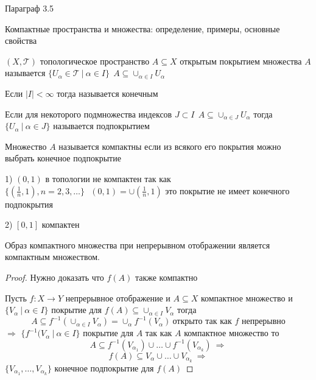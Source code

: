 \begin{title}[\Large]
  Параграф 3.5
\end{title}

\begin{title}[\Large]
  Компактные пространства и множества: определение, примеры, основные свойства
\end{title}

\begin{define}
  $(X, \mathcal{T})$ топологическое пространство $A \subseteq X$ открытым
  покрытием множества $A$ называется $\{ U_{\alpha} \in \mathcal{T} ~ | ~
  \alpha \in I \} ~~ A \subseteq \cup_{\alpha \in I} U_{\alpha}$

  Если $|I| < \infty$ тогда называется конечным

  Если для некоторого подмножества индексов $J \subset I ~~
  A \subseteq \cup_{\alpha \in J} U_{\alpha}$ тогда $\{U_{\alpha} ~ | ~
  \alpha \in J \}$ называется подпокрытием
\end{define}

\begin{define}
  Множество $A$ называется компактны если из всякого его покрытия можно выбрать
  конечное подпокрытие
\end{define}

\begin{block}[Примеры]
  1)  $(0,1)$ в топологии не компактен так как $\{(\frac{1}{n}, 1),
  n = 2,3, \ldots\} ~~~ (0,1) = \cup (\frac{1}{n}, 1)$ это покрытие не имеет
  конечного подпокрытия

  2) $[0,1]$ компактен
\end{block}

\begin{theorem}
  Образ компактного множества при непрерывном отображении является компактным
  множеством.
\end{theorem}

\begin{proof}
  Нужно доказать что $f(A)$ также компактно

  Пусть $f: X \to Y$ непрерывное отображение и $A \subseteq X$ компактное
  множество и $\{ V_{\alpha} ~ | ~ \alpha \in I \}$ покрытие для $f(A) \subseteq
  \cup_{\alpha \in I} V_{\alpha}$ тогда
  $$
  A \subseteq f^{-1} (\cup_{\alpha \in I} V_{\alpha}) =
  \cup_{\alpha} f^{-1}(V_{\alpha}) ~ \text{открыто так как $f$ непрерывно}
  $$
  $\Rightarrow$ $\{f^{-1}(V_{\alpha} ~ | ~ \alpha \in I\}$ покрытие для $A$
  так как $A$ компактное множество то
  $$
  A \subseteq f^{-1} (V_{\alpha_1}) \cup \ldots \cup f^{-1} (V_{\alpha_k})
  ~ \Rightarrow
  $$
  $$
  f(A) \subseteq V_{\alpha} \cup \ldots \cup V_{\alpha_k} ~ \Rightarrow
  $$
  $\{V_{\alpha_1}, \ldots, V_{\alpha_k}\}$ конечное подпокрытие для $f(A)$
\end{proof}

